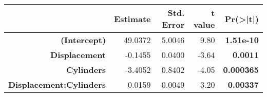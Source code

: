 \begin{tabular}{rrrrr}
  \hline
 & Estimate & Std. Error & t value & Pr(>|t|) \\ 
  \hline
\textbf{(Intercept)} & 49.0372 & 5.0046 & 9.80 & \textbf{1.51e-10} \\ 
  \textbf{Displacement} & -0.1455 & 0.0400 & -3.64 & \textbf{0.0011} \\ 
  \textbf{Cylinders} & -3.4052 & 0.8402 & -4.05 & \textbf{0.000365} \\ 
  \textbf{Displacement:Cylinders} & 0.0159 & 0.0049 & 3.20 & \textbf{0.00337} \\ 
   \hline
\end{tabular}
